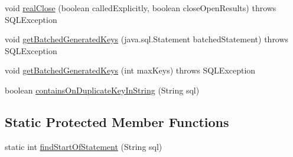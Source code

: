 \begin{DoxyCompactItemize}
void \mbox{\hyperlink{classcom_1_1mysql_1_1cj_1_1jdbc_1_1_statement_impl_aea1b46dca9271ff10f7e65ba92c224fa}{real\+Close}} (boolean called\+Explicitly, boolean close\+Open\+Results)  throws S\+Q\+L\+Exception 
\item 
void \mbox{\hyperlink{classcom_1_1mysql_1_1cj_1_1jdbc_1_1_statement_impl_af9a603cba639540f2cb9c6d998cf149e}{get\+Batched\+Generated\+Keys}} (java.\+sql.\+Statement batched\+Statement)  throws S\+Q\+L\+Exception 
\item 
void \mbox{\hyperlink{classcom_1_1mysql_1_1cj_1_1jdbc_1_1_statement_impl_ae919819a2a02e89738113125b950d694}{get\+Batched\+Generated\+Keys}} (int max\+Keys)  throws S\+Q\+L\+Exception 
\item 
boolean \mbox{\hyperlink{classcom_1_1mysql_1_1cj_1_1jdbc_1_1_statement_impl_a4731b8a25ed40cab2a2f5f238eba7a2a}{contains\+On\+Duplicate\+Key\+In\+String}} (String sql)
\end{DoxyCompactItemize}
\subsection*{Static Protected Member Functions}
\begin{DoxyCompactItemize}
\item 
static int \mbox{\hyperlink{classcom_1_1mysql_1_1cj_1_1jdbc_1_1_statement_impl_a7b294b3903bade079f3fb8addee17ab7}{find\+Start\+Of\+Statement}} (String sql)
\end{DoxyCompactItemize}
